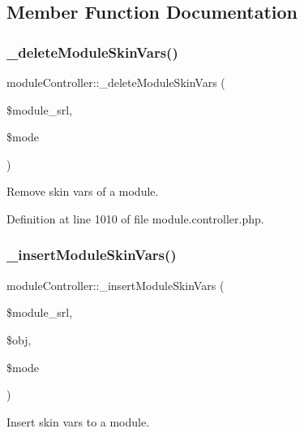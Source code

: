 \subsection{Member Function Documentation}
\hypertarget{classmoduleController_a88baeaa3755f270af223e17e7a96d20a}{}\label{classmoduleController_a88baeaa3755f270af223e17e7a96d20a} 
\subsubsection{\texorpdfstring{\+\_\+delete\+Module\+Skin\+Vars()}{\_deleteModuleSkinVars()}}
{\footnotesize\ttfamily module\+Controller\+::\+\_\+delete\+Module\+Skin\+Vars (\begin{DoxyParamCaption}\item[{}]{\$module\+\_\+srl,  }\item[{}]{\$mode }\end{DoxyParamCaption})}



Remove skin vars of a module. 



Definition at line 1010 of file module.\+controller.\+php.

\hypertarget{classmoduleController_aea2dfb4f6a1d31acdbebf131058494cd}{}\label{classmoduleController_aea2dfb4f6a1d31acdbebf131058494cd} 
\subsubsection{\texorpdfstring{\+\_\+insert\+Module\+Skin\+Vars()}{\_insertModuleSkinVars()}}
{\footnotesize\ttfamily module\+Controller\+::\+\_\+insert\+Module\+Skin\+Vars (\begin{DoxyParamCaption}\item[{}]{\$module\+\_\+srl,  }\item[{}]{\$obj,  }\item[{}]{\$mode }\end{DoxyParamCaption})}



Insert skin vars to a module. 



